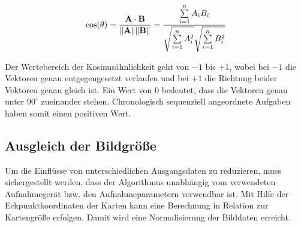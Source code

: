 \begin{equation}
\label{eq:cosinesimilarity}
\cos(\theta) = {\mathbf{A} \cdot \mathbf{B} \over \|\mathbf{A}\| \|\mathbf{B}\|} = \frac{ \sum\limits_{i=1}^{n}{A_i  B_i} }{ \sqrt{\sum\limits_{i=1}^{n}{A_i^2}}  \sqrt{\sum\limits_{i=1}^{n}{B_i^2}} }
\end{equation}

Der Wertebereich der Kosinusähnlichkeit geht von $-1$ bis $+1$, wobei bei $-1$ die Vektoren genau entgegengesetzt verlaufen und bei $+1$ die Richtung beider Vektoren genau gleich ist. Ein Wert von $0$ bedeutet, dass die Vektoren genau unter $90^{\circ}$ zueinander stehen. Chronologisch sequenziell angeordnete Aufgaben haben somit einen positiven Wert.

\subsection{Ausgleich der Bildgröße}
\label{sub:grunddaten}
Um die Einflüsse von unterschiedlichen Ausgangsdaten zu reduzieren, muss sichergestellt werden, dass der Algorithmus unabhängig vom verwendeten Aufnahmegerät bzw. den Aufnahmeparametern verwendbar ist.
Mit Hilfe der Eckpunktkoordinaten der Karten kann eine Berechnung in Relation zur Kartengröße erfolgen. Damit wird eine Normalisierung der Bilddaten erreicht.


